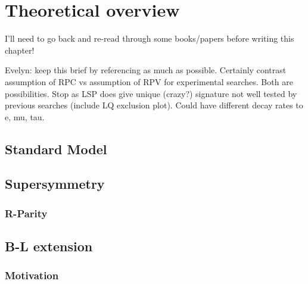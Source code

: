 \chapter[Theoretical overview][Theory]{Theoretical overview}

{\color{red} I'll need to go back and re-read through some books/papers before
  writing this chapter!}

{\color{red} Evelyn: 
keep this brief by referencing as much as possible.  Certainly contrast
assumption of RPC vs assumption of RPV for experimental searches.  Both are
possibilities.  Stop as LSP does give unique (crazy?) signature not well
tested by previous searches (include LQ exclusion plot).  Could have different
decay rates to e, mu, tau.
}

\section{Standard Model}

\section{Supersymmetry}

\subsection{R-Parity}

\section{B-L extension}

\subsection{Motivation}

